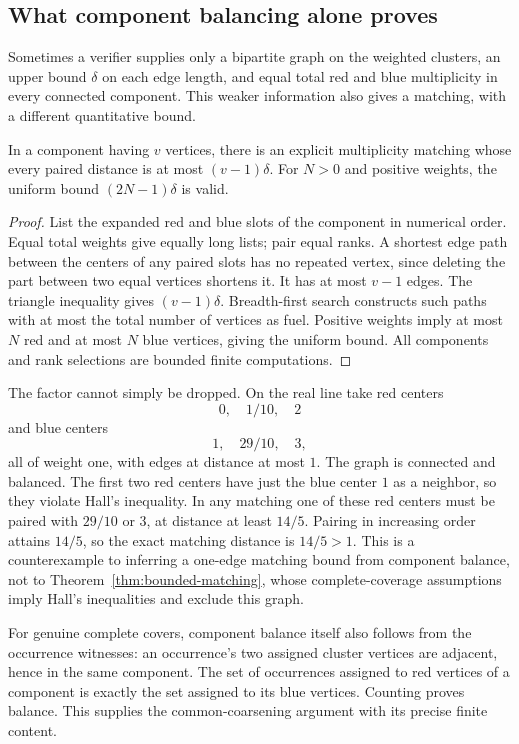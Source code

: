 \subsection{What component balancing alone proves}

Sometimes a verifier supplies only a bipartite graph on the weighted
clusters, an upper bound $\delta$ on each edge length, and equal total red
and blue multiplicity in every connected component.  This weaker
information also gives a matching, with a different quantitative bound.

\begin{proposition}
\label{prop:component-transport}
In a component having $v$ vertices, there is an explicit multiplicity
matching whose every paired distance is at most $(v-1)\delta$.  For $N>0$
and positive weights, the uniform bound $(2N-1)\delta$ is valid.
\end{proposition}
\begin{proof}
List the expanded red and blue slots of the component in numerical order.
Equal total weights give equally long lists; pair equal ranks.  A shortest
edge path between the centers of any paired slots has no repeated vertex,
since deleting the part between two equal vertices shortens it.  It has at
most $v-1$ edges.  The triangle inequality gives $(v-1)\delta$.
Breadth-first search constructs such paths with at most the total number of
vertices as fuel.  Positive weights imply at most $N$ red and at most $N$
blue vertices, giving the uniform bound.  All components and rank selections
are bounded finite computations.
\end{proof}

The factor cannot simply be dropped.  On the real line take red centers
\[
                   0,\quad 1/10,\quad 2
\]
and blue centers
\[
                   1,\quad 29/10,\quad 3,
\]
all of weight one, with edges at distance at most $1$.  The graph is
connected and balanced.  The first two red centers have just the blue center
$1$ as a neighbor, so they violate Hall's inequality.  In any matching one
of these red centers must be paired with $29/10$ or $3$, at distance at
least $14/5$.  Pairing in increasing order attains $14/5$, so the exact
matching distance is $14/5>1$.  This is a counterexample to inferring a
one-edge matching bound from component balance, not to
Theorem~\ref{thm:bounded-matching}, whose complete-coverage assumptions imply
Hall's inequalities and exclude this graph.

For genuine complete covers, component balance itself also follows from the
occurrence witnesses: an occurrence's two assigned cluster vertices are
adjacent, hence in the same component.  The set of occurrences assigned to
red vertices of a component is exactly the set assigned to its blue
vertices.  Counting proves balance.  This supplies the common-coarsening
argument with its precise finite content.

